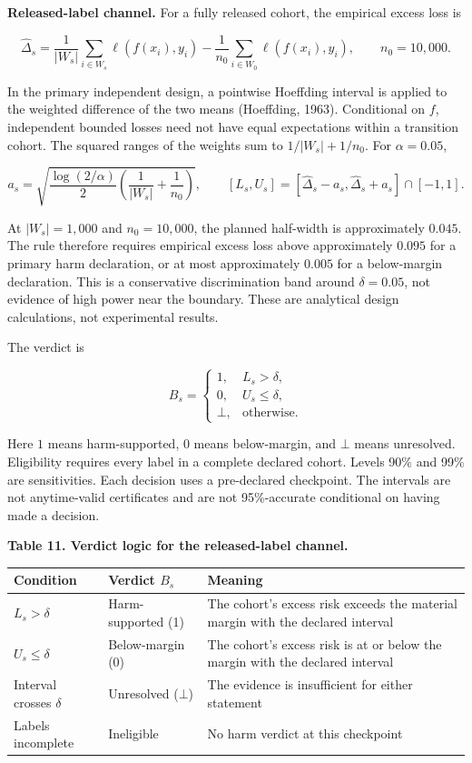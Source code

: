 \documentclass[
]{article}
\begin{document}
\textbf{Released-label channel.} For a fully released cohort, the
empirical excess loss is

\[
\widehat{\Delta}_s
=\frac{1}{|W_s|}\sum_{i\in W_s}\ell(f(x_i),y_i)
-\frac{1}{n_0}\sum_{i\in W_0}\ell(f(x_i),y_i),
\qquad n_0=10{,}000.
\]

In the primary independent design, a pointwise Hoeffding interval is
applied to the weighted difference of the two means (Hoeffding, 1963).
Conditional on \(f\), independent bounded losses need not have equal
expectations within a transition cohort. The squared ranges of the
weights sum to \(1/|W_s|+1/n_0\). For \(\alpha=0.05\),

\[
a_s=\sqrt{\frac{\log(2/\alpha)}{2}\left(\frac{1}{|W_s|}+\frac{1}{n_0}\right)},
\qquad
[L_s,U_s]=[\widehat{\Delta}_s-a_s,\widehat{\Delta}_s+a_s]\cap[-1,1].
\]

At \(|W_s|=1{,}000\) and \(n_0=10{,}000\), the planned half-width is
approximately \(0.045\). The rule therefore requires empirical excess
loss above approximately \(0.095\) for a primary harm declaration, or at
most approximately \(0.005\) for a below-margin declaration. This is a
conservative discrimination band around \(\delta=0.05\), not evidence of
high power near the boundary. These are analytical design calculations,
not experimental results.

The verdict is

\[
B_s=
\begin{cases}
1, & L_s>\delta,\\
0, & U_s\le\delta,\\
\bot, & \text{otherwise}.
\end{cases}
\]

Here \(1\) means harm-supported, \(0\) means below-margin, and \(\bot\)
means unresolved. Eligibility requires every label in a complete
declared cohort. Levels 90\% and 99\% are sensitivities. Each decision
uses a pre-declared checkpoint. The intervals are not anytime-valid
certificates and are not 95\%-accurate conditional on having made a
decision.

\textbf{Table 11. Verdict logic for the released-label channel.}

\begin{longtable}[]{@{}
  >{\raggedright\arraybackslash}p{}
  >{\raggedright\arraybackslash}p{}
  >{\raggedright\arraybackslash}p{}@{}}
\toprule
Condition & Verdict \(B_s\) & Meaning \\
\midrule
\endhead
\(L_s>\delta\) & Harm-supported (1) & The cohort's excess risk exceeds
the material margin with the declared interval \\
\(U_s\le\delta\) & Below-margin (0) & The cohort's excess risk is at or
below the margin with the declared interval \\
Interval crosses \(\delta\) & Unresolved (\(\bot\)) & The evidence is
insufficient for either statement \\
Labels incomplete & Ineligible & No harm verdict at this checkpoint \\
\bottomrule
\end{longtable}
\end{document}
